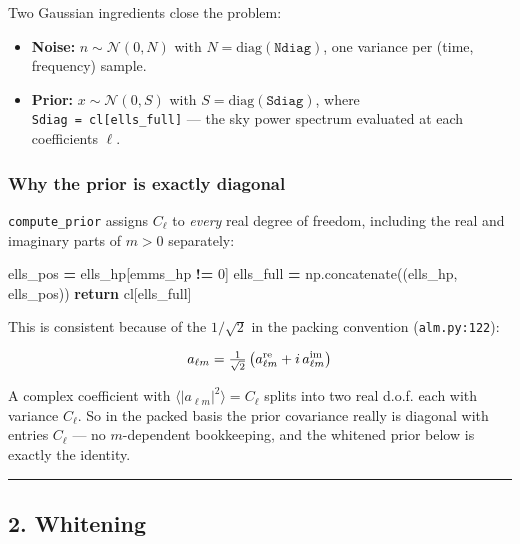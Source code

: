 \documentclass[
  11pt,
]{article}
\newenvironment{Shaded}{\begin{snugshade}}{\end{snugshade}}
\newcommand{\ControlFlowTok}[1]{\textcolor[rgb]{0.13,0.29,0.53}{\textbf{#1}}}
\newcommand{\DecValTok}[1]{\textcolor[rgb]{0.00,0.00,0.81}{#1}}
\newcommand{\NormalTok}[1]{#1}
\newcommand{\OperatorTok}[1]{\textcolor[rgb]{0.81,0.36,0.00}{\textbf{#1}}}
\providecommand{\tightlist}{%
  \setlength{\itemsep}{0pt}\setlength{\parskip}{0pt}}
\begin{document}
Two Gaussian ingredients close the problem:

\begin{itemize}
\tightlist
\item
  \textbf{Noise:} \(n \sim \mathcal{N}(0, N)\) with
  \(N = \mathrm{diag}(\texttt{Ndiag})\), one variance per (time,
  frequency) sample.
\item
  \textbf{Prior:} \(x \sim \mathcal{N}(0, S)\) with
  \(S = \mathrm{diag}(\texttt{Sdiag})\), where
  \texttt{Sdiag\ =\ cl{[}ells\_full{]}} --- the sky power spectrum
  evaluated at each coefficient\textquotesingle s \(\ell\).
\end{itemize}

\hypertarget{why-the-prior-is-exactly-diagonal}{%
\subsubsection{Why the prior is exactly
diagonal}\label{why-the-prior-is-exactly-diagonal}}

\texttt{compute\_prior} assigns \(C_\ell\) to \emph{every} real degree
of freedom, including the real and imaginary parts of \(m > 0\)
separately:

\begin{Shaded}
\begin{Highlighting}[]
\NormalTok{ells\_pos  }\OperatorTok{=}\NormalTok{ ells\_hp[emms\_hp }\OperatorTok{!=} \DecValTok{0}\NormalTok{]}
\NormalTok{ells\_full }\OperatorTok{=}\NormalTok{ np.concatenate((ells\_hp, ells\_pos))}
\ControlFlowTok{return}\NormalTok{ cl[ells\_full]}
\end{Highlighting}
\end{Shaded}

This is consistent because of the \(1/\sqrt{2}\) in the packing
convention (\texttt{alm.py:122}):

\[ a_{\ell m} = \tfrac{1}{\sqrt{2}}\left(a^{\rm re}_{\ell m} + i\,a^{\rm im}_{\ell m}\right) \]

A complex coefficient with \(\langle |a_{\ell m}|^2 \rangle = C_\ell\)
splits into two real d.o.f. each with variance \(C_\ell\). So in the
packed basis the prior covariance really is diagonal with entries
\(C_\ell\) --- no \(m\)-dependent bookkeeping, and the whitened prior
below is exactly the identity.

\begin{center}\rule{0.5\linewidth}{0.5pt}\end{center}

\hypertarget{2-whitening}{%
\subsection{2. Whitening}\label{2-whitening}}
\end{document}
